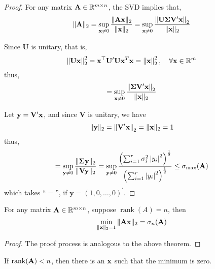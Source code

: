 \begin{proof}
	For any matrix \(\mathbf{A}\in\mathbb{R}^{m\times n}\), the SVD implies that,
	\begin{equation*}
		\|\mathbf{A}\|_{2}=\sup_{\mathbf{x}\neq 0}\frac{\|\mathbf{A}\mathbf{x}\|_{2}}{\|\mathbf{x}\|_{2}}=\sup_{\mathbf{x}\neq 0}\frac{\left\|\mathbf{U}\boldsymbol{\Sigma}\mathbf{V}^{\prime}\mathbf{x}\right\|_{2}}{\|\mathbf{x}\|_{2}}
	\end{equation*}

	Since \(\mathbf{U}\) is unitary, that is,
	\begin{equation*}
		\left\|\mathbf{U}\mathbf{x}\right\|_{2}^{2}=\mathbf{x}^{\top}\mathbf{U}^{\prime}\mathbf{U}\mathbf{x}^{T}\mathbf{x}=\left\|\mathbf{x}\right\|_{2}^{2},\quad\forall\mathbf{x}\in\mathbb{R}^{m}
	\end{equation*}
	thus,
	\begin{equation*}
		=\sup_{\mathbf{x}\neq 0}\frac{\left\|\boldsymbol{\Sigma}\mathbf{V}^{\prime}\mathbf{x}\right\|_{2}}{\|\mathbf{x}\|_{2}}
	\end{equation*}

	Let \(\mathbf{y}=\mathbf{V}^{\prime}\mathbf{x}\), and since \(\mathbf{V}\) is unitary, we have
	\begin{equation*}
		\|\mathbf{y}\|_{2}=\left\|\mathbf{V}^{\prime}\mathbf{x}\right\|_{2}=\|\mathbf{x}\|_{2}=1
	\end{equation*}
	thus,
	\begin{equation*}
		=\sup_{\mathbf{y}\neq 0}\frac{\|\boldsymbol{\Sigma}\mathbf{y}\|_{2}}{\|\mathbf{V}\mathbf{y}\|_{2}}=\sup_{\mathbf{y}\neq 0}\frac{\left(\sum_{i=1}^{r}\sigma_{i}^{2}\left|y_{i}\right|^{2}\right)^{\frac{1}{2}}}{\left(\sum_{i=1}^{r}\left|y_{i}\right|^{2}\right)^{\frac{1}{2}}}\leq\sigma_{\max}(\mathbf{A})
	\end{equation*}
	which takes ``\(=\)'', if \(\boldsymbol{y}=\left(1,0,\ldots,0\right)^{\prime}\).
\end{proof}

\begin{theorem}
	For any matrix \(\mathbf{A}\in\mathbb{R}^{m\times n}\), suppose \(\operatorname{rank}(A)=n\), then
	\begin{equation}
		\min_{\|\mathbf{x}\|_{2}=1}\|\mathbf{A}\mathbf{x}\|_{2}=\sigma_{n}(\mathbf{A})
	\end{equation}
\end{theorem}

\begin{proof}
	The proof process is analogous to the above theorem.
\end{proof}

\begin{remark}
	If \(\operatorname{rank}(\mathbf{A})<n\), then there is an \(\mathbf{x}\) such that the minimum is zero.
\end{remark}
